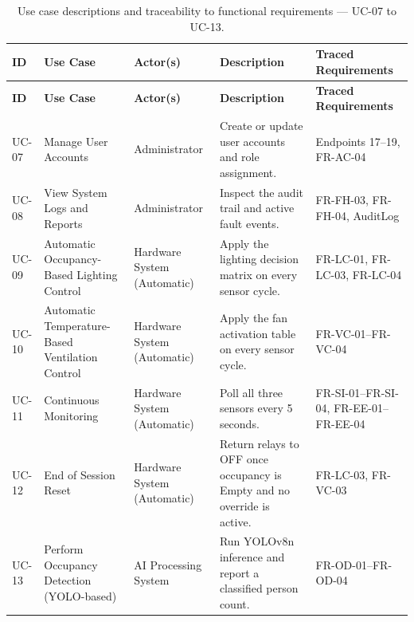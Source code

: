 \begin{longtable}{|L{1.5cm}|L{3.2cm}|L{2.8cm}|L{4.5cm}|L{2.5cm}|}
	\caption{Use case descriptions and traceability to functional requirements --- UC-07 to UC-13.} \label{tab:3-6}                                                                                                \\
	\hline
	\textbf{ID} & \textbf{Use Case}                               & \textbf{Actor(s)}           & \textbf{Description}                                                    & \textbf{Traced Requirements}           \\
	\hline
	\endfirsthead
	\hline
	\textbf{ID} & \textbf{Use Case}                               & \textbf{Actor(s)}           & \textbf{Description}                                                    & \textbf{Traced Requirements}           \\
	\hline
	\endhead
	\hline
	\endfoot
	\hline
	\endlastfoot
	UC-07       & Manage User Accounts                            & Administrator               & Create or update user accounts and role assignment.                     & Endpoints 17--19, FR-AC-04             \\
	\hline
	UC-08       & View System Logs and Reports                    & Administrator               & Inspect the audit trail and active fault events.                        & FR-FH-03, FR-FH-04, AuditLog           \\
	\hline
	UC-09       & Automatic Occupancy-Based Lighting Control      & Hardware System (Automatic) & Apply the lighting decision matrix on every sensor cycle.               & FR-LC-01, FR-LC-03, FR-LC-04           \\
	\hline
	UC-10       & Automatic Temperature-Based Ventilation Control & Hardware System (Automatic) & Apply the fan activation table on every sensor cycle.                   & FR-VC-01--FR-VC-04                     \\
	\hline
	UC-11       & Continuous Monitoring                           & Hardware System (Automatic) & Poll all three sensors every 5 seconds.                                 & FR-SI-01--FR-SI-04, FR-EE-01--FR-EE-04 \\
	\hline
	UC-12       & End of Session Reset                            & Hardware System (Automatic) & Return relays to OFF once occupancy is Empty and no override is active. & FR-LC-03, FR-VC-03                     \\
	\hline
	UC-13       & Perform Occupancy Detection (YOLO-based)        & AI Processing System        & Run YOLOv8n inference and report a classified person count.             & FR-OD-01--FR-OD-04                     \\
	\hline
\end{longtable}



